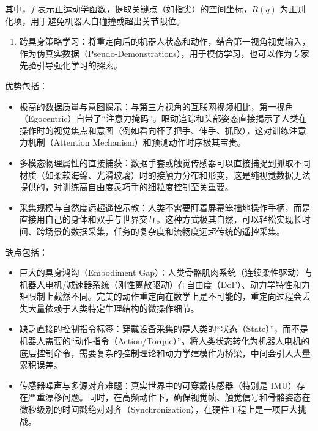 其中，\(f\) 表示正运动学函数，提取关键点（如指尖）的空间坐标，\(R(q)\) 为正则化项，用于避免机器人自碰撞或超出关节限位。

\begin{enumerate}
\def\labelenumi{\arabic{enumi}.}
\setcounter{enumi}{2}
\tightlist
\item
  跨具身策略学习：将重定向后的机器人状态和动作，结合第一视角视觉输入，作为伪真实数据（Pseudo-Demonstrations），用于模仿学习，也可以作为专家先验引导强化学习的探索。
\end{enumerate}

优势包括：

\begin{itemize}
\tightlist
\item
  极高的数据质量与意图揭示：与第三方视角的互联网视频相比，第一视角（Egocentric）自带了``注意力掩码''。眼动追踪和头部姿态直接揭示了人类在操作时的视觉焦点和意图（例如看向杯子把手、伸手、抓取），这对训练注意力机制（Attention Mechanism）和预测动作时序极其宝贵。
\item
  多模态物理属性的直接捕获：数据手套或触觉传感器可以直接捕捉到抓取不同材质（如柔软海绵、光滑玻璃）时的接触力分布和形变，这是纯视觉数据无法提供的，对训练高自由度灵巧手的细粒度控制至关重要。
\item
  采集规模与自然度远超遥控示教：人类不需要盯着屏幕笨拙地操作手柄，而是直接用自己的身体和双手与世界交互。这种方式极其自然，可以轻松实现长时间、跨场景的数据采集，任务的复杂度和流畅度远超传统的遥控采集。
\end{itemize}

缺点包括：

\begin{itemize}
\tightlist
\item
  巨大的具身鸿沟（Embodiment Gap）：人类骨骼肌肉系统（连续柔性驱动）与机器人电机/减速器系统（刚性离散驱动）在自由度（DoF）、动力学特性和力矩限制上截然不同。完美的动作重定向在数学上是不可能的，重定向过程会丢失大量依赖于人类特定生理结构的微操作细节。
\item
  缺乏直接的控制指令标签：穿戴设备采集的是人类的``状态（State）''，而不是机器人需要的``动作指令（Action/Torque）''。将人类状态转化为机器人电机的底层控制命令，需要复杂的控制理论和动力学建模作为桥梁，中间会引入大量累积误差。
\item
  传感器噪声与多源对齐难题：真实世界中的可穿戴传感器（特别是 IMU）存在严重漂移问题。同时，在高频动作下，确保视觉帧、触觉信号和骨骼姿态在微秒级别的时间戳绝对对齐（Synchronization），在硬件工程上是一项巨大挑战。
\end{itemize}

